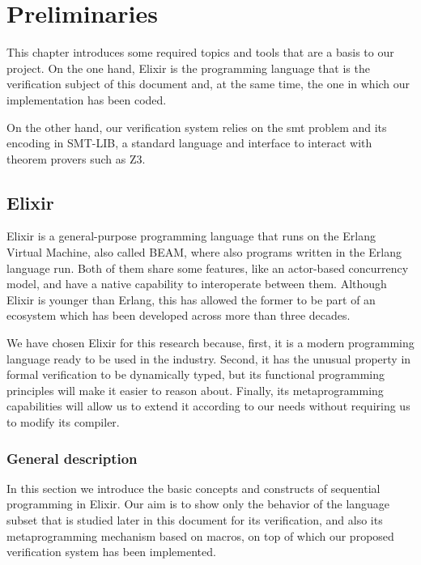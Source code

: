 \chapter{Preliminaries}
\label{cap:preliminaries}

This chapter introduces some required topics and tools that are a basis to our
project. On the one hand, Elixir is the programming language that is the
verification subject of this document and, at the same time, the one in which
our implementation has been coded.

On the other hand, our verification system relies on the \gls{smt} problem and
its encoding in SMT-LIB, a standard language and interface to interact with
theorem provers such as Z3.

\section{Elixir}

Elixir is a general-purpose programming language that runs on the Erlang Virtual
Machine, also called BEAM, where also programs written in the Erlang language
run. Both of them share some features, like an actor-based concurrency model,
and have a native capability to interoperate between them. Although Elixir is
younger than Erlang, this has allowed the former to be part of an ecosystem
which has been developed across more than three decades.

We have chosen Elixir for this research because, first, it is a modern
programming language ready to be used in the industry.  Second, it has the
unusual property in formal verification to be dynamically typed, but its
functional programming principles will make it easier to reason about. Finally,
its metaprogramming capabilities will allow us to extend it according to our
needs without requiring us to modify its compiler.

\subsection{General description}
\label{prelim:elixir}

In this section we introduce the basic concepts and constructs of sequential
programming in Elixir. Our aim is to show only the behavior of the language
subset that is studied later in this document for its verification, and also its
metaprogramming mechanism based on macros, on top of which our proposed
verification system has been implemented.

